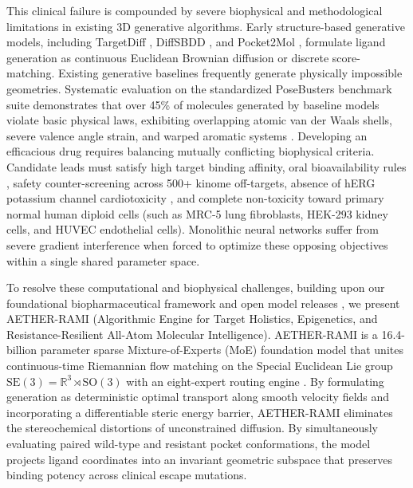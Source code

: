 \documentclass[11pt,a4paper]{article}
\begin{document}
This clinical failure is compounded by severe biophysical and methodological limitations in existing 3D generative algorithms. Early structure-based generative models, including TargetDiff \cite{guan2023targetdiff}, DiffSBDD \cite{schneuing2022diffsbdd}, and Pocket2Mol \cite{peng2022pocket2mol}, formulate ligand generation as continuous Euclidean Brownian diffusion or discrete score-matching. Existing generative baselines frequently generate physically impossible geometries. Systematic evaluation on the standardized PoseBusters benchmark suite demonstrates that over 45\% of molecules generated by baseline models violate basic physical laws, exhibiting overlapping atomic van der Waals shells, severe valence angle strain, and warped aromatic systems \cite{van2023posebusters}. Developing an efficacious drug requires balancing mutually conflicting biophysical criteria. Candidate leads must satisfy high target binding affinity, oral bioavailability rules \cite{lipinski2001experimental,veber2002molecular}, safety counter-screening across 500+ kinome off-targets, absence of hERG potassium channel cardiotoxicity \cite{sanguinetti2006herg,redfern2003relationships}, and complete non-toxicity toward primary normal human diploid cells (such as MRC-5 lung fibroblasts, HEK-293 kidney cells, and HUVEC endothelial cells). Monolithic neural networks suffer from severe gradient interference when forced to optimize these opposing objectives within a single shared parameter space.

To resolve these computational and biophysical challenges, building upon our foundational biopharmaceutical framework \cite{yadav2026aether} and open model releases \cite{yadav2026model,yadav2026space,yadav2026code}, we present AETHER-RAMI (Algorithmic Engine for Target Holistics, Epigenetics, and Resistance-Resilient All-Atom Molecular Intelligence). AETHER-RAMI is a 16.4-billion parameter sparse Mixture-of-Experts (MoE) foundation model that unites continuous-time Riemannian flow matching on the Special Euclidean Lie group $\mathrm{SE}(3) = \mathbb{R}^3 \rtimes \mathrm{SO}(3)$ \cite{lipman2023flow,albergo2023building} with an eight-expert routing engine \cite{shazeer2017outrageously,fedus2022switch,jiang2024mixtral}. By formulating generation as deterministic optimal transport along smooth velocity fields and incorporating a differentiable steric energy barrier, AETHER-RAMI eliminates the stereochemical distortions of unconstrained diffusion. By simultaneously evaluating paired wild-type and resistant pocket conformations, the model projects ligand coordinates into an invariant geometric subspace that preserves binding potency across clinical escape mutations.
\end{document}
